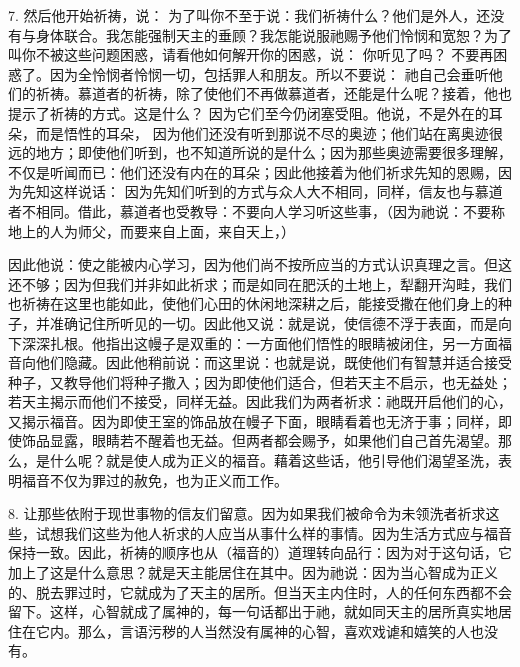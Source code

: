 7. 然后他开始祈祷，说： 为了叫你不至于说：我们祈祷什么？他们是外人，还没有与身体联合。我怎能强制天主的垂顾？我怎能说服祂赐予他们怜悯和宽恕？为了叫你不被这些问题困惑，请看他如何解开你的困惑，说： 你听见了吗？ 不要再困惑了。因为全怜悯者怜悯一切，包括罪人和朋友。所以不要说： 祂自己会垂听他们的祈祷。慕道者的祈祷，除了使他们不再做慕道者，还能是什么呢？接着，他也提示了祈祷的方式。这是什么？ 因为它们至今仍闭塞受阻。他说，不是外在的耳朵，而是悟性的耳朵， 因为他们还没有听到那说不尽的奥迹；他们站在离奥迹很远的地方；即使他们听到，也不知道所说的是什么；因为那些奥迹需要很多理解，不仅是听闻而已：他们还没有内在的耳朵；因此他接着为他们祈求先知的恩赐，因为先知这样说话： 因为先知们听到的方式与众人大不相同，同样，信友也与慕道者不相同。借此，慕道者也受教导：不要向人学习听这些事，（因为祂说：不要称地上的人为师父，而要来自上面，来自天上，）\par

因此他说：使之能被内心学习，因为他们尚不按所应当的方式认识真理之言。但这还不够；因为但我们并非如此祈求；而是如同在肥沃的土地上，犁翻开沟畦，我们也祈祷在这里也能如此，使他们心田的休闲地深耕之后，能接受撒在他们身上的种子，并准确记住所听见的一切。因此他又说：就是说，使信德不浮于表面，而是向下深深扎根。他指出这幔子是双重的：一方面他们悟性的眼睛被闭住，另一方面福音向他们隐藏。因此他稍前说：而这里说：也就是说，既使他们有智慧并适合接受种子，又教导他们将种子撒入；因为即使他们适合，但若天主不启示，也无益处；若天主揭示而他们不接受，同样无益。因此我们为两者祈求：祂既开启他们的心，又揭示福音。因为即使王室的饰品放在幔子下面，眼睛看着也无济于事；同样，即使饰品显露，眼睛若不醒着也无益。但两者都会赐予，如果他们自己首先渴望。那么，是什么呢？就是使人成为正义的福音。藉着这些话，他引导他们渴望圣洗，表明福音不仅为罪过的赦免，也为正义而工作。\par

8. 让那些依附于现世事物的信友们留意。因为如果我们被命令为未领洗者祈求这些，试想我们这些为他人祈求的人应当从事什么样的事情。因为生活方式应与福音保持一致。因此，祈祷的顺序也从（福音的）道理转向品行：因为对于这句话，它加上了这是什么意思？就是天主能居住在其中。因为祂说：因为当心智成为正义的、脱去罪过时，它就成为了天主的居所。但当天主内住时，人的任何东西都不会留下。这样，心智就成了属神的，每一句话都出于祂，就如同天主的居所真实地居住在它内。那么，言语污秽的人当然没有属神的心智，喜欢戏谑和嬉笑的人也没有。\par

